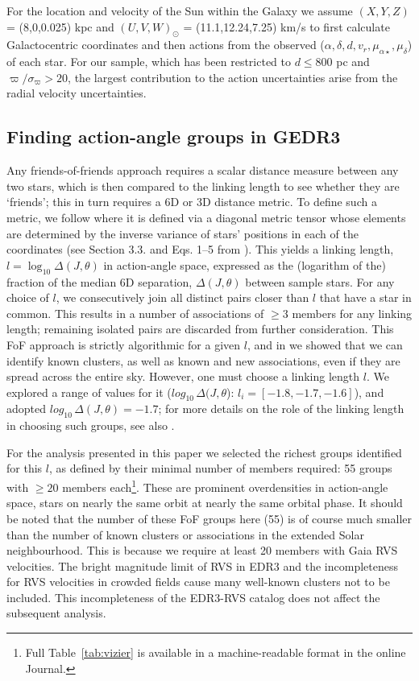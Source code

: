 \documentclass[twocolumn]{aastex631}
\begin{document}
 For the location and velocity of the Sun within the Galaxy we assume $(X,Y,Z)$ = (8,0,0.025) kpc and $(U,V,W)_{\odot}$ = (11.1,12.24,7.25) km/s \citep{2010MNRAS.403.1829S} to first calculate Galactocentric coordinates and then actions from the observed ($\alpha, \delta, d, v_{r}, \mu_{\alpha\star},\mu_{\delta}$) of each star. For our sample, which has been restricted to $d \le 800$ pc and $\varpi/\sigma_\varpi > 20$, the largest contribution to the action uncertainties arise from the radial velocity uncertainties.

\subsection{Finding action-angle groups in GEDR3}
\label{sec:fof_algorithm}

 Any friends-of-friends approach requires a scalar distance measure between any two stars, which is then compared to the linking length to see whether they are `friends'; this in turn requires a 6D or 3D distance metric. To define such a metric, we follow \citet{2020MNRAS.495.4098C} where it is defined via a diagonal metric tensor whose elements are determined by the inverse variance of stars' positions in each of the coordinates (see Section 3.3. and  Eqs. 1--5 from \citet{2020MNRAS.495.4098C}). This yields a linking length, $l=\log_{10} \Delta(J,\theta)$ in action-angle space, expressed as the (logarithm of the) fraction of the median 6D separation, $\Delta(J,\theta)$ between sample stars.
For any choice of $l$, we consecutively join all distinct pairs closer than $l$ that have a star in common. This results in a number of associations of $\ge 3$ members for any linking length; remaining isolated pairs are discarded from further consideration. This FoF approach is strictly algorithmic for a given $l$, and in \citet{2020MNRAS.495.4098C} we showed that we can identify known clusters, as well as known and new associations, even if they are spread across the entire sky. However, one must choose a linking length $l$. We explored a range of values for it ($log_{10}\,\Delta(J,\theta$):  $l_i = [-1.8, -1.7, -1.6]$),
and adopted $log_{10}\,\Delta(J,\theta) = -1.7$; for more details on the role of the linking length in choosing such groups, see also \citep{2020MNRAS.495.4098C}.

For the analysis presented in this paper we selected the richest groups identified for this $l$, as defined by their minimal number of members required: 55 groups with $\geq20$ members each\footnote{Full Table~\ref{tab:vizier} is available in a machine-readable format in the online Journal.}. These are prominent overdensities in action-angle space, stars on nearly the same orbit at nearly the same orbital phase. 
It should be noted that the number of these FoF groups here (55) is of course much smaller than the number of known clusters or associations in the extended Solar neighbourhood. This is because we require at least 20 members with Gaia RVS velocities. The bright magnitude limit of RVS in EDR3 and the incompleteness for RVS velocities in crowded fields cause many well-known clusters not to be included. This incompleteness of the EDR3-RVS catalog does not affect the subsequent analysis.
\end{document}
